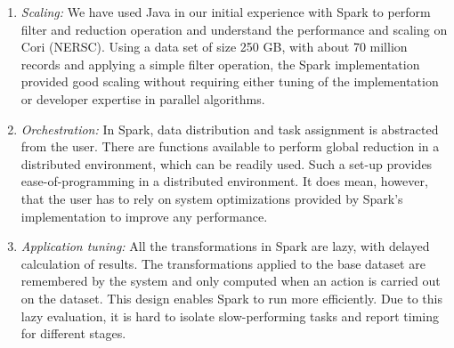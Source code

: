 \documentclass[11pt, twocolumn]{article}
\begin{document}
\begin{enumerate}
\item \textit{Scaling: }
We have used Java in our initial experience with Spark to perform filter and reduction 
operation and understand the performance and scaling on Cori (NERSC). Using a data set of size 250 GB, 
with about 70 million records and applying a simple filter operation, 
the Spark implementation provided good
  scaling without requiring either tuning of the implementation or
  developer expertise in parallel algorithms. 
  

\item \textit{Orchestration: } 
In Spark, data distribution and task assignment
  is abstracted from the user. There are functions available to
  perform global reduction in a distributed environment, which can be
  readily used.  Such a set-up provides ease-of-programming in a
  distributed environment. It does mean, however, that the user has to
  rely on system optimizations provided by Spark's implementation to
  improve any performance.

\item \textit{Application tuning: } All the transformations in Spark
  are lazy, with delayed calculation of results. The transformations
  applied to the base dataset are remembered by the system
  and only computed when an action is carried out on the dataset.
  This design enables Spark to run more efficiently. 
  Due to this lazy evaluation, it is hard to isolate slow-performing tasks and report
  timing for different stages. 


\end{enumerate}
\end{document}
